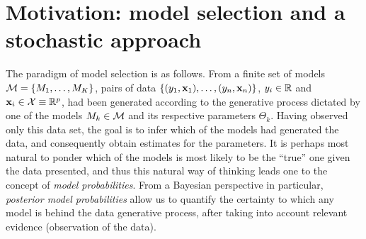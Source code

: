 \documentclass[a4paper,showframe,11pt]{report}
\begin{document}


\newpage































\newpage
\section{Motivation: model selection and a stochastic approach}\label{sec:bvs-iprior}

The paradigm of model selection is as follows. 
From a finite set of models ${\mathcal M} = \{M_1,\dots,M_K\}$, pairs of data $\{(y_1,{\mathbf x}_1),\dots,(y_n,{\mathbf x}_n)\}$, $y_i\in\mathbb{R}$ and ${\mathbf x}_i\in{\mathcal X}\equiv\mathbb{R}^p$, had been generated according to the generative process dictated by one of the models $M_k \in {\mathcal M}$ and its respective parameters $\Theta_k$.
Having observed only this data set, the goal is to infer which of the models had generated the data, and consequently obtain estimates for the parameters.
It is perhaps most natural to ponder which of the models is most likely to be the ``true'' one given the data presented, and thus this natural way of thinking leads one to the concept of \emph{model probabilities}.
From a Bayesian perspective in particular, \emph{posterior model probabilities} allow us to quantify the certainty to which any model is behind the data generative process, after taking into account relevant evidence (observation of the data).
\end{document}
